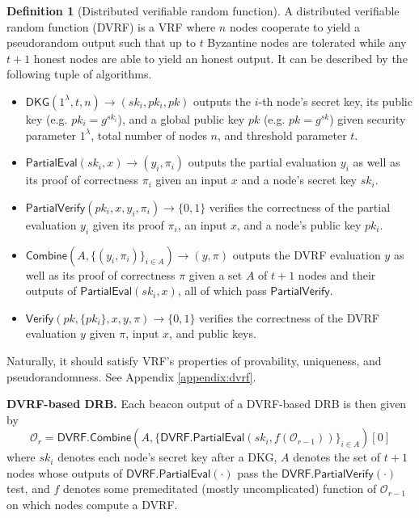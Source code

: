 \documentclass[letterpaper,twocolumn,10pt]{article}
\theoremstyle{definition}
\newtheorem{definition}[theorem]{Definition}
\theoremstyle{remark}
\begin{document}
\begin{definition}[Distributed verifiable random function]
A distributed verifiable random function (DVRF) is a VRF where $n$ nodes cooperate to yield a pseudorandom output such that up to $t$ Byzantine nodes are tolerated while any $t + 1$ honest nodes are able to yield an honest output. It can be described by the following tuple of algorithms.
\begin{itemize}
\item $\mathsf{DKG}(1^\lambda, t, n) \rightarrow (sk_i, pk_i, pk)$ outputs the $i$-th node's secret key, its public key (e.g. $pk_i = g^{sk_i}$), and a global public key $pk$ (e.g. $pk = g^{sk}$) given security parameter $1^\lambda$, total number of nodes $n$, and threshold parameter $t$.
\item $\mathsf{PartialEval}(sk_i, x) \rightarrow (y_i, \pi_i)$ outputs the partial evaluation $y_i$ as well as its proof of correctness $\pi_i$ given an input $x$ and a node's secret key $sk_i$.
\item $\mathsf{PartialVerify}(pk_i, x, y_i, \pi_i) \rightarrow \{0, 1\}$ verifies the correctness of the partial evaluation $y_i$ given its proof $\pi_i$, an input $x$, and a node's public key $pk_i$.
\item $\mathsf{Combine}(A, \{(y_i, \pi_i)\}_{i \in A}) \rightarrow (y, \pi)$ outputs the DVRF evaluation $y$ as well as its proof of correctness $\pi$ given a set $A$ of $t + 1$ nodes and their outputs of $\mathsf{PartialEval}(sk_i, x)$, all of which pass $\mathsf{PartialVerify}$.
\item $\mathsf{Verify}(pk, \{pk_i\}, x, y, \pi) \rightarrow \{0, 1\}$ verifies the correctness of the DVRF evaluation $y$ given $\pi$, input $x$, and public keys.
\end{itemize}
Naturally, it should satisfy VRF's properties of provability, uniqueness, and pseudorandomness. See Appendix \ref{appendix:dvrf}.
\end{definition}

\noindent\textbf{DVRF-based DRB.} Each beacon output of a DVRF-based DRB is then given by
\begingroup\makeatletter\def\f@size{8}\check@mathfonts
\[
\mathcal{O}_r = \mathsf{DVRF.Combine}(A, \{\mathsf{DVRF.PartialEval}(sk_i, f(\mathcal{O}_{r - 1}))\}_{i \in A})[0]
\]\endgroup
where $sk_i$ denotes each node's secret key after a DKG, $A$ denotes the set of $t + 1$ nodes whose outputs of $\mathsf{DVRF.PartialEval}(\cdot)$ pass the $\mathsf{DVRF.PartialVerify}(\cdot)$ test, and $f$ denotes some premeditated (mostly uncomplicated) function of $\mathcal{O}_{r - 1}$ on which nodes compute a DVRF.
\end{document}
